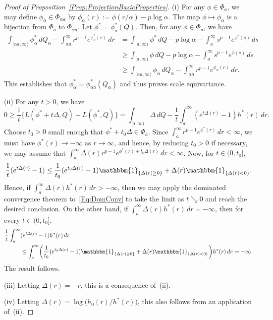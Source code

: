 \documentclass[a4paper,12pt]{article}
\begin{document}
\begin{proof}[Proof of Proposition~\ref{Prop:ProjectionBasicProperties}]
  (i) For any $\phi \in \Phi_{a}$, we may define $\phi_\alpha \in \Phi_{\alpha a}$ by $\phi_\alpha(r) := \phi(r/\alpha) - p \log \alpha$.  The map $\phi \mapsto \phi_\alpha$ is a bijection from $\Phi_{a}$ to $\Phi_{\alpha a}$.  Let $\phi^* = \phi_{a}^*(Q)$. Then, for any $\phi \in \Phi_{a}$, we have 
  \begin{align*}
    \int_{[\alpha a,\infty)} \phi^{*}_\alpha\, dQ_\alpha - \int_{\alpha a}^\infty r^{p-1} e^{\phi^{*}_\alpha (r)} \, dr
    &= \int_{[a,\infty)} \phi^* \, dQ - p \log \alpha - \int_{a}^\infty s^{p-1}e^{\phi^{*}(s)} \, ds \\
    &\geq \int_{[a,\infty)} \phi \, dQ - p \log \alpha - \int_{a}^\infty s^{p-1} e^{\phi(s)}  \, ds \\
    &\geq   \int_{[\alpha a,\infty)} \phi_\alpha\, dQ_\alpha - \int_{\alpha a}^\infty r^{p-1}e^{\phi_\alpha(r)} \, dr.
    \end{align*}
    This establishes that $\phi^{*}_\alpha = \phi_{\alpha a}^*(Q_\alpha)$ and thus proves scale equivariance.

    (ii) For any $t > 0$, we have
\begin{equation}
\label{Eq:DomConv}
0 \geq \frac{1}{t}\bigl\{L(\phi^*+t\Delta,Q) -L(\phi^*,Q)\bigr\} = \int_{[a,\infty)} \Delta \, dQ - \frac{1}{t}\int_{a}^\infty (e^{t\Delta(r)} - 1)h^*(r) \, dr.
\end{equation}
Choose $t_0 > 0$ small enough that $\phi^* + t_0 \Delta \in \Phi_{a}$.  Since $\int_{a}^\infty r^{p-1} e^{\phi^*(r)} \, dr < \infty$, we must have $\phi^*(r) \rightarrow -\infty$ as $r \rightarrow \infty$, and hence, by reducing $t_0 > 0$ if necessary, we may assume that $\int_{a}^\infty \Delta(r) r^{p-1} e^{\phi^*(r)+t_0\Delta(r)} \, dr < \infty$.  Now, for $t \in (0,t_0]$,
\[
\frac{1}{t}(e^{t\Delta(r)} - 1) \leq \frac{1}{t_0}(e^{t_0\Delta(r)} - 1)\mathbbm{1}_{\{\Delta(r) \geq 0\}} + \Delta(r)\mathbbm{1}_{\{\Delta(r) < 0\}}.
\]
Hence, if $\int_{a}^\infty \Delta(r) h^*(r) \, dr > -\infty$, then we may apply the dominated convergence theorem to~\eqref{Eq:DomConv} to take the limit as $t \searrow 0$ and reach the desired conclusion.  On the other hand, if $\int_{a}^\infty \Delta(r) h^*(r) \, dr = -\infty$, then for every $t \in (0,t_0]$,
\begin{align*}
\frac{1}{t} \int_{a}^\infty &(e^{t\Delta(r)} - 1)h^*(r) \, dr \\
&\leq \int_{a}^\infty \biggl(\frac{1}{t_0}(e^{t_0\Delta(r)} - 1)\mathbbm{1}_{\{\Delta(r) \geq 0\}} + \Delta(r)\mathbbm{1}_{\{\Delta(r) < 0\}}\biggr)h^*(r) \, dr = -\infty.
\end{align*}
The result follows.

(iii) Letting $\Delta(r) = -r$, this is a consequence of~(ii). 

(iv) Letting $\Delta(r) =\log \bigl(h_0(r)/h^*(r)\bigr)$, this also follows from an application of~(ii).
\end{proof}
\end{document}

